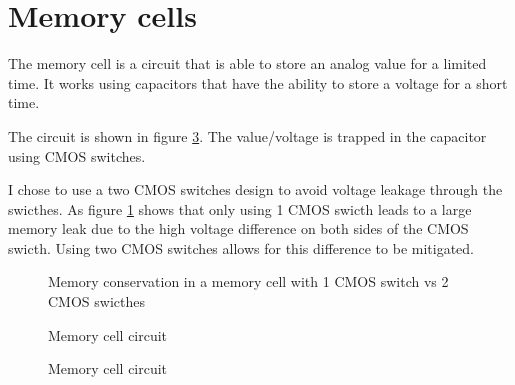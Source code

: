\section{Memory cells}
\label{sec:memcell}

The memory cell is a circuit that is able to store an analog value for a limited time. It works using capacitors that have the ability to store a voltage for a short time.

The circuit is shown in figure \ref{fig:memcellCircuit}. The value/voltage is trapped in the capacitor using CMOS switches.


I chose to use a two CMOS switches design to avoid voltage leakage through the swicthes. As figure \ref{fig:memcellLoss} shows that only using 1 CMOS swicth leads to a large memory leak due to the high voltage difference on both sides of the CMOS swicth. Using two CMOS switches allows for this difference to be mitigated.

\begin{figure}[H]
  \centering
  
  \caption{Memory conservation in a memory cell with 1 CMOS switch vs 2 CMOS swicthes}
  \label{fig:memcellLoss}
\end{figure}

\begin{figure}[H]
  \centering
  
  \caption{Memory cell circuit}
  \label{fig:memcellCircuit}
\end{figure}

\begin{figure}[H]
  \centering
  
  \caption{Memory cell circuit}
  \label{fig:memcellCircuit}
\end{figure}
